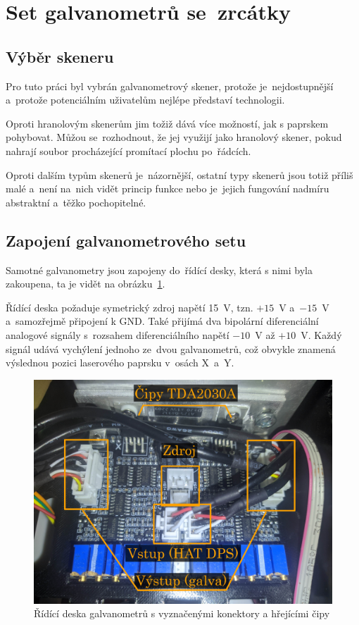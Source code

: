 \section{Set galvanometrů se~zrcátky} \label{sec:my-galvos}
\subsection{Výběr skeneru}
Pro tuto práci byl vybrán galvanometrový skener, protože je~nejdostupnější a~protože potenciálním uživatelům nejlépe představí technologii.

Oproti hranolovým skenerům jim tožiž dává více možností, jak s paprskem pohybovat.
Můžou se~rozhodnout, že jej využijí jako hranolový skener, pokud nahrají soubor procházející promítací plochu po~řádcích.

Oproti dalším typům skenerů je~názornější, ostatní typy skenerů jsou totiž příliš malé a~není na~nich vidět princip funkce nebo je~jejich fungování nadmíru abstraktní a~těžko pochopitelné.

\subsection{Zapojení galvanometrového setu}
Samotné galvanometry jsou zapojeny do~řídící desky, která s nimi byla zakoupena, ta je vidět na obrázku~\ref{fig:hw_galvoboard}.

Řídící deska požaduje symetrický zdroj napětí 15~V, tzn. $+15$~V a~$-15$~V a~samozřejmě připojení k GND. Také přijímá dva bipolární diferenciální analogové signály s~rozsahem diferenciálního napětí $-10$~V až $+10$~V. Každý signál udává vychýlení jednoho ze~dvou galvanometrů, což obvykle znamená výslednou pozici laserového paprsku v~osách X~a~Y.

\begin{figure}[htb]
  \centering
  \includegraphics[width=1\textwidth]{img/hw_galvoboard.jpg}
  \caption{\label{fig:hw_galvoboard} Řídící deska galvanometrů s vyznačenými konektory a hřejícími čipy}
\end{figure}

